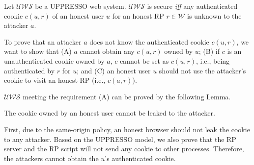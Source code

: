 \vspace{-\topsep}
\begin{definition}
Let $\mathcal{UWS}$ be a UPPRESSO web system. $\mathcal{UWS}$ is secure {\em iff} any authenticated cookie $c(u,r)$ of an honest user $u$ for an honest RP $r \in \mathcal{W}$ is unknown to the attacker $a$.
\label{def:secure}
\end{definition}
\vspace{-\topsep}
To prove that an attacker $a$ does not know the authenticated cookie $c(u,r)$, we want to show that (A) $a$ cannot obtain any $c(u,r)$ owned by $u$; (B) if $c$ is an unauthenticated cookie owned by $a$, $c$ cannot be set as $c(u,r)$, i.e., being authenticated by $r$ for $u$; and (C) an honest user $u$ should not use the attacker's cookie to visit an honest RP (i.e., $c(a,r)$).

$\mathcal{UWS}$ meeting the requirement (A) can be proved by the following Lemma.
\vspace{-\topsep}
\begin{lemma}
The cookie owned by an honest user cannot be leaked to the attacker.
\label{lemma:cookie}
\end{lemma}
\vspace{-\topsep}
First, due to the same-origin policy, an honest browser should not leak the cookie to any attacker. Based on the UPPRESSO model, we also prove that the RP server and the RP script will not send any cookie to other processes. Therefore, the attackers cannot obtain the $u$'s authenticated  cookie.

